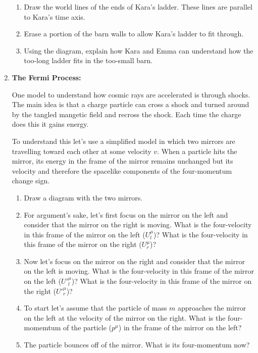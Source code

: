 \begin{enumerate}
\begin{enumerate}
\item Draw the world lines of the ends of Kara's ladder.
These lines are parallel to Kara's time axis.

\item Erase a portion of the barn walls to allow Kara's ladder
  to fit through.   

\item Using the diagram, explain how Kara and Emma can
  understand how the too-long ladder fits in the too-small barn.
\end{enumerate}

\item{\bf The Fermi Process:}

One model to understand how cosmic rays are accelerated is through
shocks. The main idea is that a charge particle can cross a shock and
turned around by the tangled mangetic field and recross the shock.
Each time the charge does this it gains energy.   

To understand this let's use a simplified model in which two mirrors
are travelling toward each other at some velocity $v$.  When a
particle hits the mirror, its energy in the frame of the mirror
remains unchanged but its velocity and therefore the spacelike
components of the four-momentum change sign.
\begin{enumerate}
\item Draw a diagram with the two mirrors.

\item For argument's
sake, let's first focus on the mirror on the left and consider that
the mirror on the right is moving.   What is the four-velocity in this
frame of the mirror on the left ($U_{l}^\mu$)?  What is the four-velocity in this
frame of the mirror on the right ($U_{r}^\mu$)?

\item Now let's focus on the mirror on the right and consider that
the mirror on the left is moving.  What is the four-velocity in this
frame of the mirror on the left ($U'^\mu_l$)?  What is the
four-velocity in this frame of the mirror on the right ($U'^\mu_r$)?

\item To start let's assume that the particle of mass $m$
  approaches the mirror on the left at the velocity of the mirror on
  the right.  What is the four-momemtum of the particle ($p^\mu$) in
  the frame of the mirror on the left?

\item The particle bounces off of the mirror.  What is its
  four-momentum now?


\end{enumerate}
\end{enumerate}
